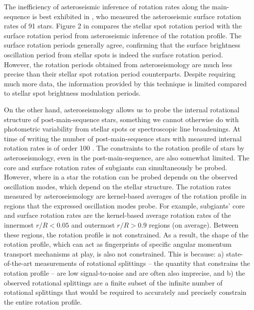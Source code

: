The inefficiency of asteroseismic inference of rotation rates along the main-sequence is best exhibited in \citet{hall_weakened_2021}, who measured the asteroseismic surface rotation rates of 91 stars.
Figure 2 in \citet{hall_weakened_2021} compares the stellar spot rotation period with the surface rotation period from asteroseismic inference of the rotation profile.
The surface rotation periods generally agree, confirming that the surface brightness oscillation period from stellar spots is indeed the surface rotation period.
However, the rotation periods obtained from asteroseismology are much less precise than their stellar spot rotation period counterparts.
Despite requiring much more data, the information provided by this technique is limited compared to stellar spot brightness modulation periods.

On the other hand, asteroseismology allows us to probe the internal rotational structure of post-main-sequence stars, something we cannot otherwise do with photometric variability from stellar spots or spectroscopic line broadenings.
At time of writing the number of post-main-sequence stars with measured internal rotation rates is of order 100 \citep[see, e.g.,][]{deheuvels_seismic_2014,gehan_measuring_2019,li_asteroseismology_2020,li_asteroseismology_2020-1,moyano_asteroseismology_2022}.
The constraints to the rotation profile of stars by asteroseismology, even in the post-main-sequence, are also somewhat limited.
The core and surface rotation rates of subgiants can simultaneously be probed.
However, where in a star the rotation can be probed depends on the observed oscillation modes, which depend on the stellar structure.
The rotation rates measured by asteroseismology are kernel-based averages of the rotation profile in regions that the expressed oscillation modes probe.
For example, subgiants' core and surface rotation rates are the kernel-based average rotation rates of the innermost $r/R<0.05$ and outermost $r/R>0.9$ regions (on average).
Between these regions, the rotation profile is not constrained.
As a result, the shape of the rotation profile, which can act as fingerprints of specific angular momentum transport mechanisms at play, is also not constrained.
This is because: a) state-of-the-art measurements of rotational splittings -- the quantity that constrains the rotation profile -- are low signal-to-noise and are often also imprecise, and b) the observed rotational splittings are a finite subset of the infinite number of rotational splittings that would be required to accurately and precisely constrain the entire rotation profile.

